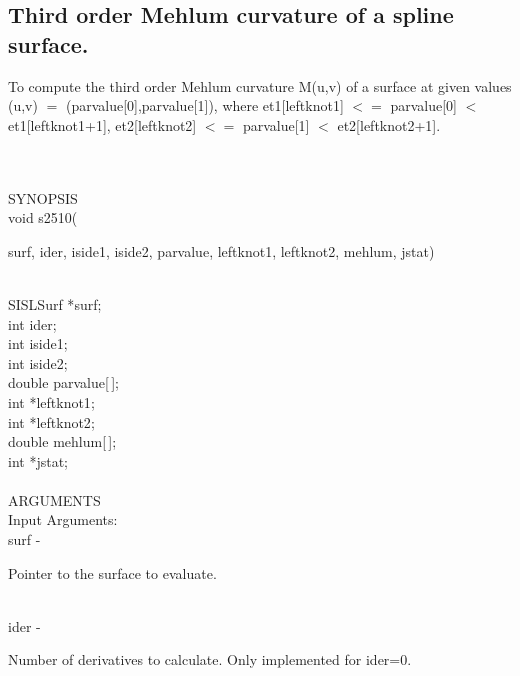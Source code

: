 \subsection{Third order Mehlum curvature of a spline surface.}
\begin{minipg1}
 To compute the third order Mehlum curvature M(u,v) of a 
                   surface at given values (u,v) $=$ (parvalue[0],parvalue[1]), 
                   where
                     et1[leftknot1] $<=$ parvalue[0] $<$ et1[leftknot1+1],
                     et2[leftknot2] $<=$ parvalue[1] $<$ et2[leftknot2+1].
\end{minipg1} \\ \\
SYNOPSIS\\
        \>  void s2510(\begin{minipg3}
            {\fov surf},  {\fov ider},  {\fov iside1},  {\fov iside2},  {\fov parvalue},  {\fov leftknot1},  {\fov leftknot2},  {\fov mehlum},  {\fov jstat})
                \end{minipg3}\\
                \>\>    SISLSurf \> *{\fov surf};\\
                \>\>    int    \>  {\fov ider};\\
                \>\>    int    \>  {\fov iside1};\\
                \>\>    int    \>  {\fov iside2};\\
                \>\>    double \> {\fov parvalue}[\,];\\
                \>\>    int \> *{\fov leftknot1};\\
                \>\>    int \> *{\fov leftknot2};\\
                \>\>    double \> {\fov mehlum}[\,];\\
                \>\>    int \> *{\fov jstat};\\
\\
ARGUMENTS\\
	\>Input Arguments:\\
        \>\>    {\fov surf}\> - \>  \begin{minipg2}
                     Pointer to the surface to evaluate.
                               \end{minipg2}\\[0.8ex]
        \>\>    {\fov ider}\> - \>  \begin{minipg2}
                     Number of derivatives to calculate.
                     Only implemented for ider=0.
                               \end{minipg2}\\[0.8ex]
